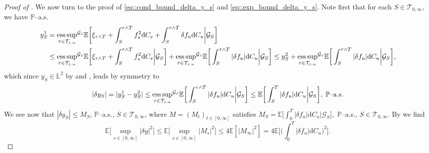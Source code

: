 \documentclass[10pt]{article} %
\newcommand\cG{\mathcal G}
\newcommand\cT{\mathcal T}
\newcommand{\smalltext}[1]{\text{\fontsize{4}{4}\selectfont$#1$}}
\def \E{\mathbb{E}}
\def \L{\mathbb{L}}
\def \P{\mathbb{P}}
\newcommand{\1}{\mathbf{1}}
\def\d{\mathrm{d}}
\DeclareMathOperator*{\esssup}{ess\,sup}
\begin{document}
\begin{proof}[Proof of ]
	\medskip
	We now turn to the proof of \eqref{eq::cond_bound_delta_y_s} and \eqref{eq::exp_bound_delta_y_s}. Note first that for each $S \in \cT_{0,\infty}$, we have $\P$--a.s.
	\begin{align*}
		y^1_S &= {\esssup_{\tau \in \cT_{\smalltext{S}\smalltext{,}\smalltext{\infty}}}}^{\cG_\smalltext{S}} \E\bigg[ \xi_{\tau \land T} + \int_S^{\tau \land T} f^2_s \d C_s + \int_S^{\tau \land T} \delta f_u \d C_u \bigg| \cG_S\bigg] \\
		&\leq {\esssup_{\tau \in \cT_{\smalltext{S}\smalltext{,}\smalltext{\infty}}}}^{\cG_\smalltext{S}} \E\bigg[ \xi_{\tau \land T} + \int_S^{\tau \land T} f^2_s \d C_s \bigg| \cG_S \bigg] + {\esssup_{\tau \in \cT_{\smalltext{S}\smalltext{,}\smalltext{\infty}}}}^{\cG_\smalltext{S}} \E\bigg[ \int_S^{\tau \land T} |\delta f_u| \d C_u \bigg| \cG_S\bigg] \leq y^2_S + {\esssup_{\tau \in \cT_{\smalltext{S}\smalltext{,}\smalltext{\infty}}}}^{\cG_\smalltext{S}} \E\bigg[ \int_S^{\tau \land T} |\delta f_u| \d C_u \bigg| \cG_S\bigg], 
	\end{align*}
	which since $y_S \in \L^2$ by  and , leads by symmetry to
	\begin{equation*}
		|\delta y_S| = |y^1_S - y^2_S| \leq {\esssup_{\tau \in \cT_{\smalltext{S}\smalltext{,}\smalltext{\infty}}}}^{\cG_\smalltext{S}} \E\bigg[ \int_S^{\tau \land T} |\delta f_u| \d C_u \bigg| \cG_S\bigg] \leq \E\bigg[ \int_S^T |\delta f_u| \d C_u \bigg| \cG_S\bigg], \; \text{$\P$--a.s.}
	\end{equation*}
	We see now that $|\delta y_S| \leq M_S$, $\P$--a.s., $S \in \cT_{0,\infty}$, where $M = (M_t)_{t \in [0,\infty]}$ satisfies $M_S = \E\big[ \int_0^T |\delta f_u| \d C_u \big| \cG_S\big],$ $\P$--a.s.,  $S \in \cT_{0,\infty}.$ By  we find
	\begin{equation*}
		\E\bigg[\sup_{s \in [0,\infty]} |\delta y|^2\bigg] \leq \E\bigg[\sup_{s \in [0,\infty]} |M_s|^2\bigg] \leq 4  \E[|M_\infty|^2] = 4  \E\bigg[ \bigg(\int_0^T |\delta f_u| \d C_u\bigg)^2 \bigg].
	\end{equation*}
	

\end{proof}
\end{document}
